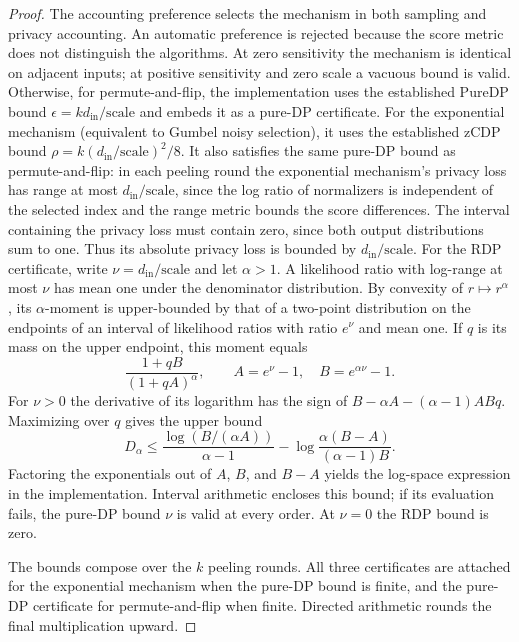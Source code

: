 \documentclass{article}
\begin{document}
\begin{proof}
    The accounting preference selects the mechanism in both sampling and privacy accounting.
    An automatic preference is rejected because the score metric does not distinguish the algorithms.
    At zero sensitivity the mechanism is identical on adjacent inputs; at positive sensitivity and zero scale a vacuous bound is valid.
    Otherwise, for permute-and-flip, the implementation uses the established PureDP bound
    $\epsilon = k d_\mathrm{in}/\mathrm{scale}$ and embeds it as a pure-DP certificate.
    For the exponential mechanism (equivalent to Gumbel noisy selection), it uses the established zCDP bound
    $\rho = k(d_\mathrm{in}/\mathrm{scale})^2/8$.
    It also satisfies the same pure-DP bound as permute-and-flip:
    in each peeling round the exponential mechanism's privacy loss has range at most
    $d_\mathrm{in}/\mathrm{scale}$, since the log ratio of normalizers is
    independent of the selected index and the range metric bounds the score differences.
    The interval containing the privacy loss must contain zero, since both
    output distributions sum to one. Thus its absolute privacy loss is bounded by
    $d_\mathrm{in}/\mathrm{scale}$.
    For the RDP certificate, write $\nu=d_\mathrm{in}/\mathrm{scale}$ and let
    $\alpha>1$. A likelihood ratio with log-range at most $\nu$ has mean one under
    the denominator distribution. By convexity of $r\mapsto r^\alpha$, its
    $\alpha$-moment is upper-bounded by that of a two-point distribution on the
    endpoints of an interval of likelihood ratios with ratio $e^\nu$ and mean one.
    If $q$ is its mass on the upper endpoint, this moment equals
    \[
        \frac{1+qB}{(1+qA)^\alpha},\qquad
        A=e^\nu-1,\quad B=e^{\alpha\nu}-1.
    \]
    For $\nu>0$ the derivative of its logarithm has the sign of
    $B-\alpha A-(\alpha-1)ABq$. Maximizing over $q$ gives the upper bound
    \[
        D_\alpha \le \frac{\log(B/(\alpha A))}{\alpha-1}
                    -\log\frac{\alpha(B-A)}{(\alpha-1)B}.
    \]
    Factoring the exponentials out of $A$, $B$, and $B-A$ yields the log-space
    expression in the implementation. Interval arithmetic encloses this bound;
    if its evaluation fails, the pure-DP bound $\nu$ is valid at every order.
    At $\nu=0$ the RDP bound is zero.

    The bounds compose over the $k$ peeling rounds. All three certificates are
    attached for the exponential mechanism when the pure-DP bound is finite,
    and the pure-DP certificate for permute-and-flip when finite.
    Directed arithmetic rounds the final multiplication upward.
\end{proof}



\end{document}

